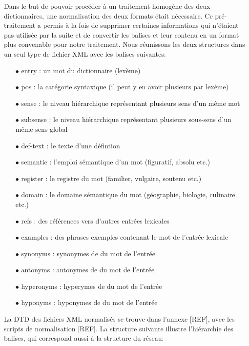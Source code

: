 \documentclass{article}
\begin{document}
Dans le but de pouvoir procéder à un traitement homogène des deux dictionnaires, une normalisation des deux formats était nécessaire. Ce pré-traitement a permis à la fois de supprimer certaines informations qui n'étaient pas utilisée par la suite et de convertir les balises et leur contenu en un format plus convenable pour notre traitement. Nous réunissons les deux structures dans un seul type de fichier XML avec les balises suivantes:
\newline
    \begin{itemize}
        \item[$\bullet$] entry : un mot du dictionnaire (lexème)
        \item[$\bullet$] pos : la catégorie syntaxique (il peut y en avoir plusieurs par lexème)
        \item[$\bullet$] sense : le niveau hiérarchique représentant plusieurs sens d'un même mot
        \item[$\bullet$] subsense : le niveau hiérarchique représentant plusieurs sous-sens d'un même sens global
        \item[$\bullet$] def-text : le texte d'une défintion
        \item[$\bullet$] semantic : l'emploi sémantique d'un mot (figuratif, absolu etc.)
        \item[$\bullet$] register : le registre du mot (familier, vulgaire, soutenu etc.)
        \item[$\bullet$] domain : le domaine sémantique du mot (géographie, biologie, culinaire etc.)
        \item[$\bullet$] refs : des références vers d'autres entrées lexicales
        \item[$\bullet$] examples : des phrases exemples contenant le mot de l'entrée lexicale
        \item[$\bullet$] synonyms : synonymes de du mot de l'entrée
        \item[$\bullet$] antonyms : antonymes de du mot de l'entrée
        \item[$\bullet$] hyperonyms : hyperymes de du mot de l'entrée
        \item[$\bullet$] hyponyms : hyponymes de du mot de l'entrée
    \end{itemize}
\bigskip

La DTD des fichiers XML normalisés se trouve dans l'annexe [REF], avec les scripts de normalisation [REF].
La structure suivante illustre l'hiérarchie des balises, qui correspond aussi à la structure du réseau:
\end{document}
